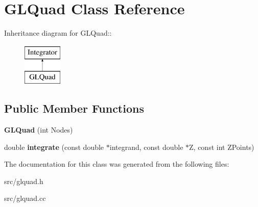 \hypertarget{classGLQuad}{
\section{GLQuad Class Reference}
\label{db/d06/classGLQuad}
}
Inheritance diagram for GLQuad::\begin{figure}[H]
\begin{center}
\leavevmode
\includegraphics[height=2cm]{db/d06/classGLQuad}
\end{center}
\end{figure}
\subsection*{Public Member Functions}
\begin{DoxyCompactItemize}
\item 
\hypertarget{classGLQuad_a835d29af2507b6b2716794d3371d2ba8}{
{\bfseries GLQuad} (int Nodes)}
\label{db/d06/classGLQuad_a835d29af2507b6b2716794d3371d2ba8}

\item 
\hypertarget{classGLQuad_a951e36d849cfadc749a62218212802b6}{
double {\bfseries integrate} (const double $\ast$integrand, const double $\ast$Z, const int ZPoints)}
\label{db/d06/classGLQuad_a951e36d849cfadc749a62218212802b6}

\end{DoxyCompactItemize}


The documentation for this class was generated from the following files:\begin{DoxyCompactItemize}
\item 
src/glquad.h\item 
src/glquad.cc\end{DoxyCompactItemize}
